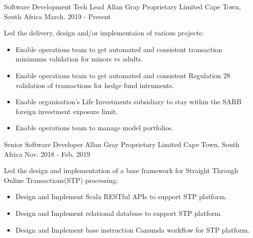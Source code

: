 

\begin{cventries}
  \cventry
    {Software Development Tech Lead} %
    {Allan Gray Proprietary Limited} %
    {Cape Town, South Africa} %
    {March. 2019 - Present} %
    {
      \begin{cvitems} %
        \item {Led the delivery, design and/or implementaion of various projects:}  
        \begin{itemize}
          \item {Enable operations team to get automated and consistent transaction minimums validation for minors vs adults.}
          \item {Enable operations team to get automated and consistent Regulation 28 validation of transactions for hedge fund intruments.}
          \item {Enable organisation's Life Investments subsidiary to stay within the SARB foreign investment exposure limit.}
          \item {Enable operations team to manage model portfolios.}
        \end{itemize}
      \end{cvitems}
    }

  \cventry
    {Senior Software Developer} %
    {Allan Gray Proprietary Limited} %
    {Cape Town, South Africa} %
    {Nov. 2018 - Feb. 2019} %
    {
      \begin{cvitems} %
        \item {Led the design and implementation of a base framework for Straight Through Online Transactions(STP) processing:}
        \begin{itemize}
          \item {Design and Implement Scala RESTful APIs to support STP platform.} 
          \item {Design and Implement relational database to support STP platform.} 
          \item {Design and Implement base instruction Camunda workflow for STP platform.} 
        \end{itemize}
      \end{cvitems}
    }


\end{cventries}
